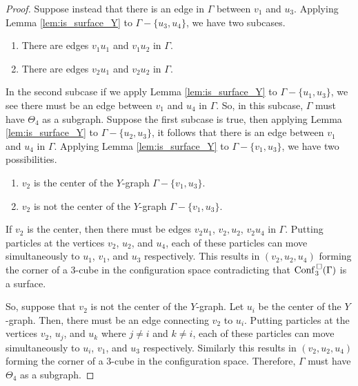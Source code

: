 \begin{proof}
    Suppose instead that there is an edge in \(\Gamma\) between \(v_1\) and \(u_3\).
    Applying Lemma \ref{lem:is_surface_Y} to \(\Gamma - \{u_3, u_4\}\),
    we have two subcases.
    \begin{enumerate}
        \item There are edges \(v_1 u_1\) and \(v_1 u_2\) in \(\Gamma\).
        \item There are edges \(v_2 u_1\) and \(v_2 u_2\) in \(\Gamma\).
    \end{enumerate}
    In the second subcase if we apply Lemma \ref{lem:is_surface_Y} to \(\Gamma - \{u_1, u_3\}\),
    we see there must be an edge between \(v_1\) and \(u_4\) in \(\Gamma\).
    So, in this subcase, \(\Gamma\) must have \(\Theta_4\) as a subgraph.
    Suppose the first subcase is true, then applying Lemma \ref{lem:is_surface_Y} to \(\Gamma - \{u_2, u_3\}\),
    it follows that there is an edge between \(v_1\) and \(u_4\) in \(\Gamma\).
    Applying Lemma \ref{lem:is_surface_Y} to \(\Gamma - \{v_1, u_3\}\),
    we have two possibilities.
    \begin{enumerate}
        \item \(v_2\) is the center of the \(Y\)-graph \(\Gamma - \{v_1, u_3\}\).
        \item \(v_2\) is not the center of the \(Y\)-graph \(\Gamma - \{v_1, u_3\}\).
    \end{enumerate}
    If \(v_2\) is the center, then there must be edges \(v_2 u_1\), \(v_2, u_2\), \(v_2 u_4\) in \(\Gamma\).
    Putting particles at the vertices \(v_2\), \(u_2\), and \(u_4\), each of these particles can move
    simultaneously to \(u_1\), \(v_1\), and \(u_3\) respectively.
    This results in \((v_2, u_2, u_4)\) forming the corner of a \(3\)-cube in the configuration space
    contradicting that \(\mathrm{Conf}^{\,\square}_3(\Gamma)\) is a surface.

    So, suppose that \(v_2\) is not the center of the \(Y\)-graph. Let \(u_i\) be the center of the \(Y\)-graph.
    Then, there must be an edge connecting \(v_2\) to \(u_i\).
    Putting particles at the vertices \(v_2\), \(u_j\), and \(u_k\) where \(j \neq i\) and \(k \neq i\),
    each of these particles can move simultaneously to \(u_i\), \(v_1\), and \(u_3\) respectively.
    Similarly this results in \((v_2, u_2, u_4)\) forming the corner of a \(3\)-cube in the configuration space.
    Therefore, \(\Gamma\) must have \(\Theta_4\) as a subgraph.


\end{proof}
